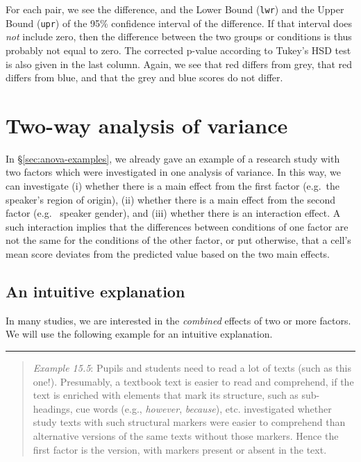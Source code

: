 \documentclass[
]{book}
\begin{document}
For each pair, we see the difference, and the Lower Bound (\texttt{lwr}) and
the Upper Bound (\texttt{upr}) of the 95\% confidence interval
of the difference. If that interval does \emph{not} include zero, then
the difference between the two groups or conditions is thus probably not
equal to zero. The corrected p-value according to
Tukey's HSD test is also given in the last column.
Again, we see that red differs from grey, that red differs from
blue, and that the grey and blue scores do not differ.

\hypertarget{two-way-analysis-of-variance}{%
\section{Two-way analysis of variance}\label{two-way-analysis-of-variance}}

In §\ref{sec:anova-examples}, we already gave an example
of a research study with two factors which were investigated in one analysis
of variance. In this way, we can investigate (i) whether there is a
main effect from the first factor (e.g.~the speaker's region of origin),
(ii) whether there is a main effect from the second factor (e.g.~
speaker gender), and (iii) whether there is an interaction effect.
A such interaction implies that the differences between conditions of
one factor are not the same
for the conditions of the other factor, or put otherwise, that a cell's mean
score deviates from the predicted value based on the two main effects.

\hypertarget{an-intuitive-explanation}{%
\subsection{An intuitive explanation}\label{an-intuitive-explanation}}

In many studies, we are interested in the \emph{combined} effects
of two or more factors. We will use the following example for an intuitive explanation.

\begin{center}\rule{0.5\linewidth}{0.5pt}\end{center}

\begin{quote}
\emph{Example 15.5}:
Pupils and students need to read a lot of texts (such as this one!).
Presumably, a textbook text is easier to read and comprehend, if the text is enriched with elements that mark its structure, such as sub-headings, cue words (e.g., \emph{however}, \emph{because}), etc.
\citet{DBE12} investigated whether study texts with such structural markers were easier to comprehend than alternative versions of the same texts without those markers. Hence the first factor is the version, with markers present or absent in the text.
\end{quote}
\end{document}
